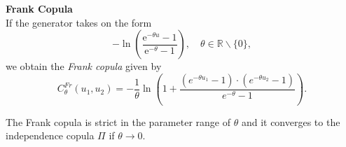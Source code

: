 \textbf{Frank Copula}\\
If the generator takes on the form
\begin{equation}
-\ln \left(\frac{\mathrm{e}^{-\theta u}-1}{\mathrm{e}^{-\theta}-1}\right), \quad \theta \in \mathbb{R} \backslash\{0\},
\end{equation}
we obtain the \textit{Frank copula} given by
\begin{equation}
C_{\theta}^{F r}\left(u_{1}, u_{2}\right)=-\frac{1}{\theta} \ln \left(1+\frac{\left(e^{-\theta u_{1}}-1\right) \cdot\left(e^{-\theta u_{2}}-1\right)}{e^{-\theta}-1}\right).
\end{equation}

The Frank copula is strict in the parameter range of $\theta$ and it converges to the independence copula $\Pi$ if $\theta \rightarrow 0$.
\\


